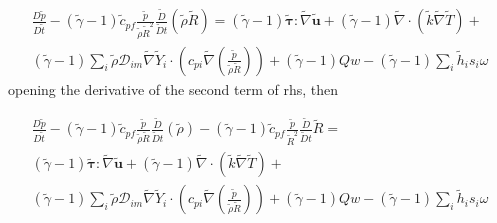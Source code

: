 \documentclass[preprint,12pt,authoryear]{elsarticle}
\begin{document}
\begin{equation}
\begin{split}
        \frac{D \tilde{p}}{D\tilde{t}}
	-
	(\tilde{\gamma}-1)
        \tilde{c}_{pf}
	\frac{ \tilde{p} }{\tilde{\rho}\tilde{R}^2}
        \frac{\tilde{D}}{\tilde{D} t}
	(
	\tilde{\rho}\tilde{R}
	)
        =
	(\tilde{\gamma}-1)
        \pmb{\tilde{\tau}}:\tilde{\nabla} \tilde{\mathbf{u}} 
        + 
	(\tilde{\gamma}-1)
        \tilde{\nabla} \cdot (\tilde{k}\tilde{\nabla} \tilde{T})
        +
	\\
	(\tilde{\gamma}-1)
        \sum\limits_i 
        \tilde{\rho}
        \mathcal{D}_{im}
        \tilde{\nabla}
        \tilde{Y}_i     
        \cdot
        \left(
                c_{pi}
                \tilde{\nabla}
                \left(
                	\frac{\tilde{p}}{\tilde{\rho}\tilde{R}}
                \right)
        \right)
	+
	(\tilde{\gamma}-1)
	Qw
	-
	(\tilde{\gamma}-1)
        \sum\limits_i
	\tilde{h}_i
        s_i \omega	
\end{split}
\end{equation}
opening the derivative of the second term of rhs, then 


\begin{equation}
\begin{split}
        \frac{D \tilde{p}}{D\tilde{t}}
	-
	(\tilde{\gamma}-1)
        \tilde{c}_{pf}
	\frac{ \tilde{p} }{\tilde{\rho}\tilde{R}}
        \frac{\tilde{D}}{\tilde{D} t}
	(
	\tilde{\rho}
	)
	-
	(\tilde{\gamma}-1)
        \tilde{c}_{pf}
	\frac{  \tilde{p} } {\tilde{R}^2}
        \frac{\tilde{D}}{\tilde{D} t}
	\tilde{R}
        =
	\\
	(\tilde{\gamma}-1)
        \pmb{\tilde{\tau}}:\tilde{\nabla} \tilde{\mathbf{u}} 
        + 
	(\tilde{\gamma}-1)
        \tilde{\nabla} \cdot (\tilde{k}\tilde{\nabla} \tilde{T})
        +
	\\
	(\tilde{\gamma}-1)
        \sum\limits_i 
        \tilde{\rho}
        \mathcal{D}_{im}
        \tilde{\nabla}
        \tilde{Y}_i     
        \cdot
        \left(
                c_{pi}
                \tilde{\nabla}
                \left(
                	\frac{\tilde{p}}{\tilde{\rho}\tilde{R}}
                \right)
        \right)
	+
	(\tilde{\gamma}-1)
	Qw
	-
	(\tilde{\gamma}-1)
        \sum\limits_i
	\tilde{h}_i
        s_i \omega	
\end{split}
\end{equation}
\end{document}
